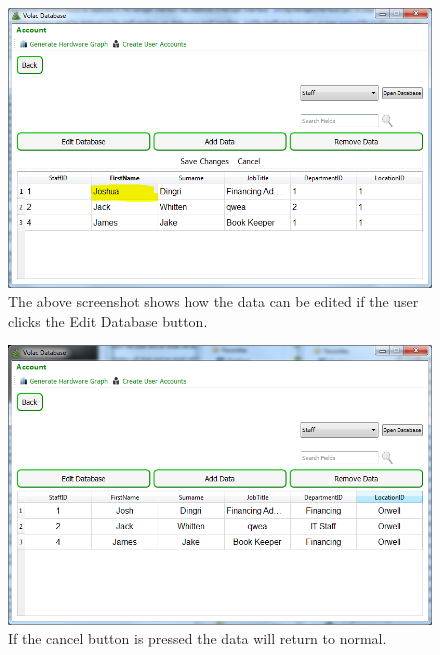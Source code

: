\begin{figure}[H]
    \includegraphics[width=\textwidth]{./Testing/Images/EditDataBtn.png}
    \caption{The above screenshot shows how the data can be edited if the user clicks the Edit Database button.} \label{fig:EditDataBtn}
\end{figure}

\begin{figure}[H]
    \includegraphics[width=\textwidth]{./Testing/Images/OpenDatabaseAfterBrowser.png}
    \caption{If the cancel button is pressed the data will return to normal.} \label{fig:CancelBtn}
\end{figure}

